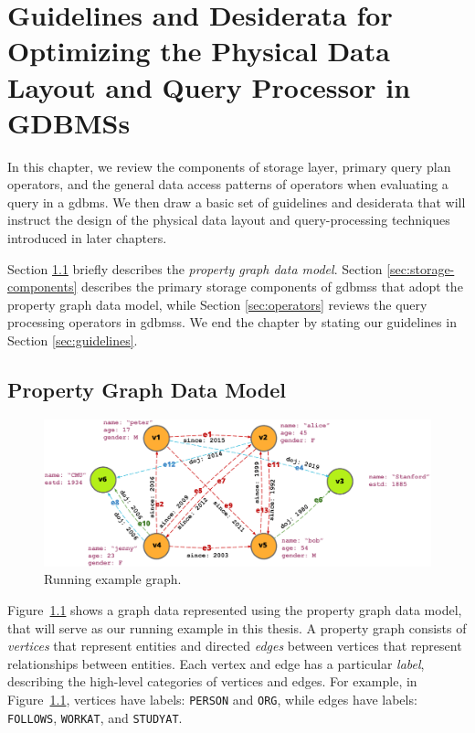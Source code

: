 \chapter{Guidelines and Desiderata for Optimizing the Physical Data Layout and Query Processor in GDBMSs}
\label{c:guidelines}

In this chapter, we review the components of storage layer, primary query plan operators, and the general data access patterns of operators when evaluating a query in a \gls{gdbms}. We then draw a basic set of guidelines and desiderata that will instruct the design of the physical data layout and query-processing techniques introduced in later chapters.

Section \ref{sec:property-graph-data-model} briefly describes the \emph{property graph data model}. Section \ref{sec:storage-components} describes the primary storage components of \gls{gdbms}s that adopt the property graph data model, while Section \ref{sec:operators} reviews the query processing operators in \gls{gdbms}s. We end the chapter by stating our guidelines in Section \ref{sec:guidelines}.

\section{Property Graph Data Model}
\label{sec:property-graph-data-model}

\begin{figure}
	\includegraphics[scale=0.86]{img/property-graph}
	\vspace{-8pt}
	\caption{Running example graph.}
	\label{fig:runn}
	\vspace{-8pt}
\end{figure}

Figure~\ref{fig:runn} shows a graph data represented using the property graph data model, that will serve as our running example in this thesis. A property graph consists of \emph{vertices} that represent entities and directed \emph{edges} between vertices that represent relationships between entities. Each vertex and edge has a particular \emph{label}, describing the high-level categories of vertices and edges. For example, in Figure~\ref{fig:runn}, vertices have labels: \texttt{PERSON} and \texttt{ORG}, while edges have labels: \texttt{FOLLOWS}, \texttt{WORKAT}, and \texttt{STUDYAT}.

